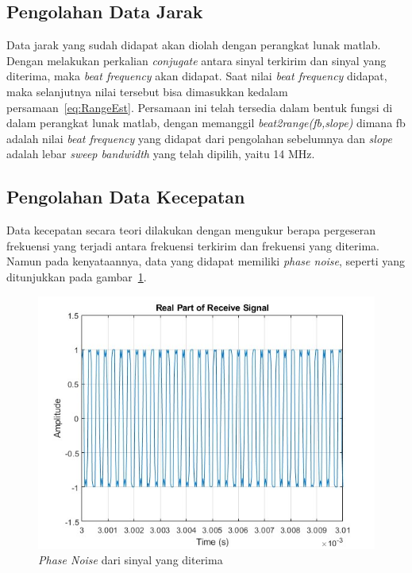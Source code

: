 \subsection{Pengolahan Data Jarak}

Data jarak yang sudah didapat akan diolah dengan perangkat lunak matlab. Dengan melakukan perkalian \textit{conjugate} antara sinyal terkirim dan sinyal yang diterima, maka \textit{beat frequency} akan didapat. Saat nilai \textit{beat frequency} didapat, maka selanjutnya nilai tersebut bisa dimasukkan kedalam persamaan~\ref{eq:RangeEst}. Persamaan ini telah tersedia dalam bentuk fungsi di dalam perangkat lunak matlab, dengan memanggil \textit{beat2range(fb,slope)} dimana fb adalah nilai \textit{beat frequency} yang didapat dari pengolahan sebelumnya dan \textit{slope} adalah lebar \textit{sweep bandwidth} yang telah dipilih, yaitu 14 MHz. 

\subsection{Pengolahan Data Kecepatan}

Data kecepatan secara teori dilakukan dengan mengukur berapa pergeseran frekuensi yang terjadi antara frekuensi terkirim dan frekuensi yang diterima. Namun pada kenyataannya, data yang didapat memiliki \textit{phase noise}, seperti yang ditunjukkan pada gambar~\ref{fig:phaseNoise}. 

\begin{figure}
	\centering
	\includegraphics[scale=0.5]{pics/bab4/RealPartRx.jpg}
	\caption{\textit{Phase Noise} dari sinyal yang diterima}
	\label{fig:phaseNoise}
\end{figure}

